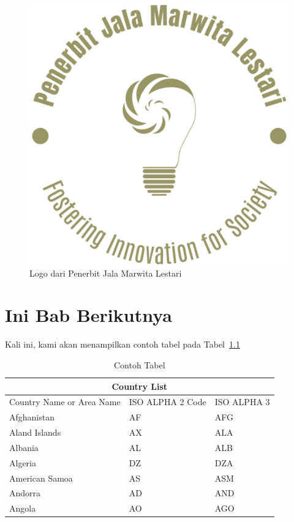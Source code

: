 \documentclass[oneside,a4paper,11pt,explicit]{book}
\begin{document}
\begin{figure}[h]
    \centering
    \includegraphics[scale=0.35]{img/logo-penerbit-jamali.png}
    \caption{Logo dari Penerbit Jala Marwita Lestari}
    \label{fig:logo}
\end{figure}

\chapter{Ini Bab Berikutnya}

Kali ini, kami akan menampilkan contoh tabel pada Tabel~\ref{table:contoh-tabel}

{
\begin{table}[H]
\caption{Contoh Tabel}
\label{table:contoh-tabel}
\begin{tabular}{ |p{5cm}|p{3cm}|p{3cm}|  }
\hline
\multicolumn{3}{|c|}{Country List} \\
\hline
Country Name or Area Name& ISO ALPHA 2 Code &ISO ALPHA 3 \\
\hline
Afghanistan & AF &AFG \\
Aland Islands & AX   & ALA \\
Albania &AL & ALB \\
Algeria    &DZ & DZA \\
American Samoa & AS & ASM \\
Andorra & AD & AND   \\
Angola & AO & AGO \\
\hline
\end{tabular}
\end{table}}
\end{document}
